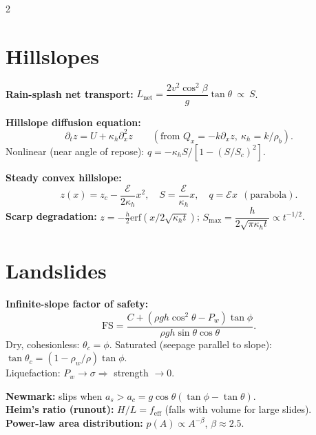 \documentclass[9pt,a4paper]{extarticle}
\begin{document}
\begin{multicols}{2}
\section{Hillslopes}
\begin{eqbox}
\textbf{Rain-splash net transport:} $L_\mathrm{net}=\dfrac{2v^2\cos^2\beta}{g}\tan\theta\ \propto\ S$.
\end{eqbox}
\begin{eqbox}
\textbf{Hillslope diffusion equation:}
\[
\boxed{\partial_tz=U+\kappa_h\partial_x^2z}\qquad(\text{from }Q_x=-k\partial_xz,\ \kappa_h=k/\rho_b).
\]
Nonlinear (near angle of repose): $q=-\kappa_hS/[1-(S/S_c)^2]$.
\end{eqbox}
\begin{eqbox}
\textbf{Steady convex hillslope:}
\[
z(x)=z_c-\frac{\mathcal E}{2\kappa_h}x^2,\quad S=\frac{\mathcal E}{\kappa_h}x,\quad q=\mathcal Ex\ \ (\text{parabola}).
\]
\textbf{Scarp degradation:} $z=-\tfrac h2\mathrm{erf}(x/2\sqrt{\kappa_ht})$; $S_\mathrm{max}=\dfrac{h}{2\sqrt{\pi\kappa_ht}}\propto t^{-1/2}$.
\end{eqbox}

\section{Landslides}
\begin{eqbox}
\textbf{Infinite-slope factor of safety:}
\[
\mathrm{FS}=\dfrac{C+(\rho gh\cos^2\theta-P_w)\tan\phi}{\rho gh\sin\theta\cos\theta}.
\]
Dry, cohesionless: $\theta_c=\phi$. Saturated (seepage parallel to slope): $\tan\theta_c=(1-\rho_w/\rho)\tan\phi$.\\
Liquefaction: $P_w\to\sigma\Rightarrow$ strength $\to0$.
\end{eqbox}
\begin{eqbox}
\textbf{Newmark:} slips when $a_s>a_c=g\cos\theta(\tan\phi-\tan\theta)$.\\
\textbf{Heim's ratio (runout):} $H/L=f_\mathrm{eff}$ (falls with volume for large slides).\\
\textbf{Power-law area distribution:} $p(A)\propto A^{-\beta}$, $\beta\approx2.5$.
\end{eqbox}


\end{multicols}
\end{document}
